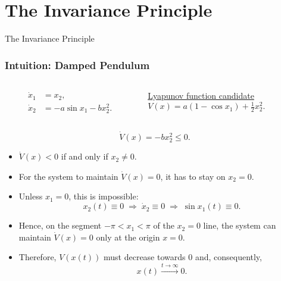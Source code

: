 \section{The Invariance Principle}

\begin{frame}
    The Invariance Principle


\end{frame}

\begingroup
\small


\begin{frame}
    \frametitle{Intuition: Damped Pendulum}

    \begin{columns}
        \begin{column}{0.5\textwidth}
            \begin{align*}
                \dot{x}_1 &= x_2, \\
                \dot{x}_2 &= -a \sin{x_1} - bx_2^2.
            \end{align*}
        \end{column}
        \begin{column}{0.5\textwidth}
            \underline{Lyapunov function candidate}\\[0.75ex]
            $ V(x) = a(1 - \cos{x_1}) + \frac{1}{2}x_2^2. $
        \end{column}
    \end{columns}
    \[ \dot{V}(x) = -bx_2^2 \leq 0. \]

    \begin{itemize}
        \item $\dot{V}(x) < 0$ if and only if $x_2 \neq 0$.
        \item For the system to maintain $\dot{V}(x) = 0$, it has to stay on
        $x_2=0$.
        \item Unless $x_1=0$, this is impossible:
        \[ x_2(t) \equiv 0 \; \Rightarrow \; \dot{x}_2 \equiv 0 \; \Rightarrow
        \; \sin{x_1(t)} \equiv 0. \]
        \item Hence, on the segment $-\pi < x_1 < \pi$ of the $x_2=0$ line, the
        system can maintain $\dot{V}(x) = 0$ only at the origin $x=0$.
        \item Therefore, $V(x(t))$ must decrease towards $0$ and, consequently, 
        \[ x(t) \xrightarrow{t \to \infty} 0. \]
    \end{itemize}
\end{frame}


\endgroup
